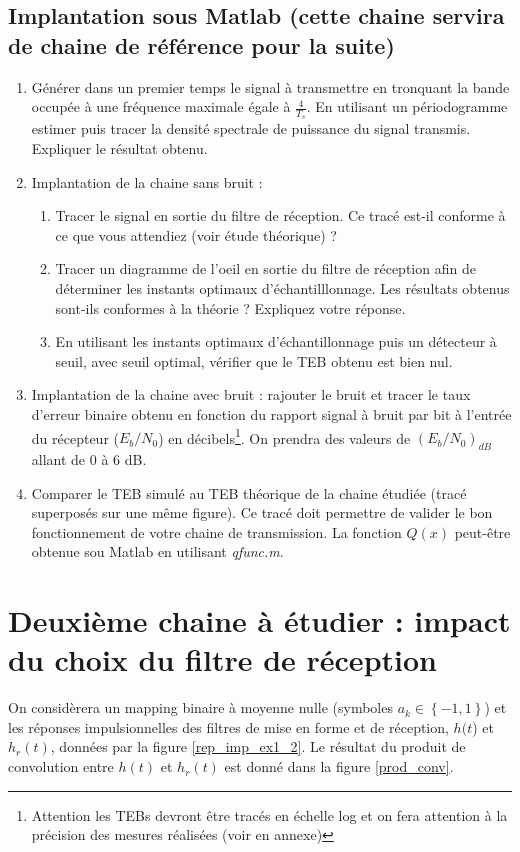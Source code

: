 \documentclass{article}
\begin{document}
\subsection{Implantation sous Matlab (cette chaine servira de chaine de référence pour la suite)}
    \begin{enumerate}
        \item Générer dans un premier temps le signal à transmettre en tronquant la bande occupée à une fréquence maximale égale à $\frac{4}{T_s}$. En utilisant un périodogramme estimer puis tracer la densité spectrale de puissance du signal transmis. Expliquer le résultat obtenu.
        \item Implantation de la chaine sans bruit :
            \begin{enumerate}
                \item Tracer le signal en sortie du filtre de réception. Ce tracé est-il conforme à ce que vous attendiez (voir étude théorique) ?
                \item Tracer un diagramme de l'oeil en sortie du filtre de réception afin de déterminer les instants optimaux d'échantilllonnage. Les résultats obtenus sont-ils conformes à la théorie ? Expliquez votre réponse.
                \item En utilisant les instants optimaux d'échantillonnage puis un détecteur à seuil, avec seuil optimal, vérifier que le TEB obtenu est bien nul.
            \end{enumerate}
        \item Implantation de la chaine avec bruit : rajouter le bruit et tracer le taux d'erreur binaire obtenu en fonction du rapport signal à bruit par bit à l'entrée du récepteur ($E_b/N_0$) en décibels\footnote{Attention les TEBs devront être tracés en échelle log et on fera attention à la précision des mesures réalisées (voir en annexe)}. On prendra des valeurs de $\left(E_b/N_0\right)_{dB}$ allant de $0$ à $6$ dB.
        \item Comparer le TEB simulé au TEB théorique de la chaine étudiée (tracé superposés sur une même figure). Ce tracé doit permettre de valider le bon fonctionnement de votre chaine de transmission. La fonction $Q(x)$ peut-être obtenue sou Matlab en utilisant \emph{qfunc.m}.\\
    \end{enumerate}

\section{Deuxième chaine à étudier : impact du choix du filtre de réception}
On considèrera un mapping binaire à moyenne nulle (symboles $a_k \in \left\{-1,1\right\}$) et les réponses impulsionnelles des filtres de mise en forme et de réception, $h(t$) et $h_r(t)$, données par la figure \ref{rep_imp_ex1_2}. Le résultat du produit de convolution entre $h(t)$ et $h_r(t)$ est donné dans la figure \ref{prod_conv}.
\end{document}
